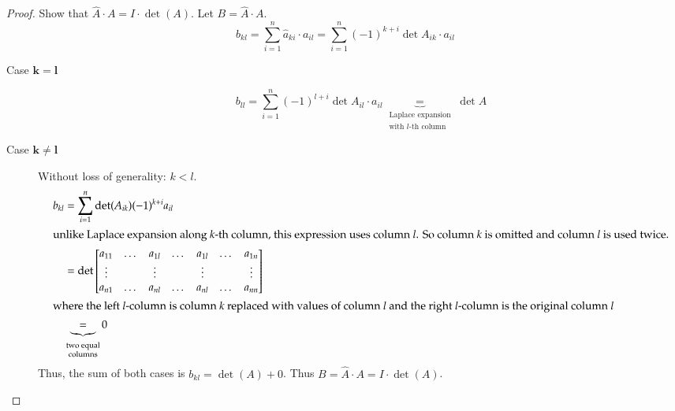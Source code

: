 \documentclass[a4paper]{article}
\numberwithin{lecref}{section}
\begin{document}
\begin{proof}
  Show that $\hat{A} \cdot A = I \cdot \det(A)$.
  Let $B = \hat{A} \cdot A$.
  \[ b_{kl} = \sum_{i=1}^n \hat{a}_{ki} \cdot a_{il} = \sum_{i=1}^n (-1)^{k+i} \det{A_{ik}} \cdot a_{il} \]
  \begin{description}
    \item[Case $\mathbf{k=l}$]
      \[
        b_{ll} = \sum_{i=1}^n (-1)^{l+i} \det{A_{il}} \cdot a_{il}
          \underbrace{=}_{\substack{\text{Laplace expansion} \\ \text{with $l$-th column}}} \det{A}
      \]
    \item[Case $\mathbf{k \neq l}$] Without loss of generality: $k < l$.
      \begin{align*}
        b_{kl} &= \sum_{i=1}^n \det(A_{ik}) (-1)^{k+i} a_{il} \\
        \intertext{unlike Laplace expansion along $k$-th column, this expression uses column $l$. So column $k$ is omitted and column $l$ is used twice.}
               &= \det\begin{bmatrix}
                 a_{11} & \dots & a_{1l} & \dots & a_{1l} & \dots & a_{1n} \\
                 \vdots &       & \vdots &       & \vdots &       & \vdots \\
                 a_{n1} & \dots & a_{nl} & \dots & a_{nl} & \dots & a_{nn}
               \end{bmatrix} \\
        \intertext{where the left $l$-column is column $k$ replaced with values of column $l$ and the right $l$-column is the original column $l$}
               &\underbrace{=}_{\substack{\text{two equal} \\ \text{columns}}} 0
      \end{align*}
      Thus, the sum of both cases is $b_{kl} = \det(A) + 0$. Thus $B = \hat A \cdot A = I \cdot \det(A)$.
  \end{description}
\end{proof}
\end{document}
